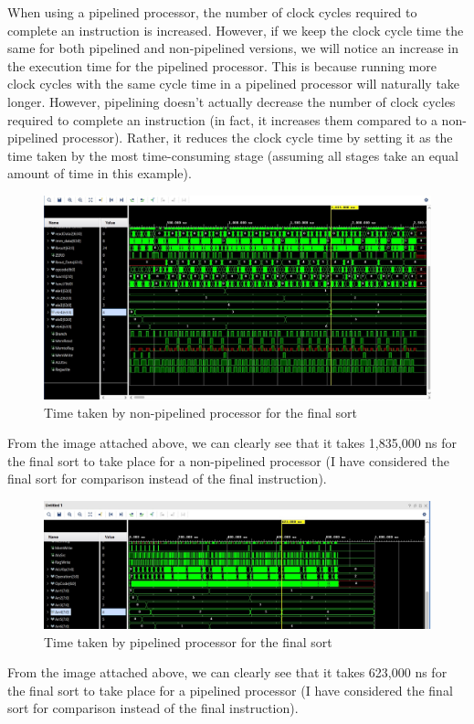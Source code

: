 \documentclass{article}
\begin{document}
When using a pipelined processor, the number of clock cycles required to complete an instruction is increased. However, if we keep the clock cycle time the same for both pipelined and non-pipelined versions, we will notice an increase in the execution time for the pipelined processor. This is because running more clock cycles with the same cycle time in a pipelined processor will naturally take longer. However, pipelining doesn't actually decrease the number of clock cycles required to complete an instruction (in fact, it increases them compared to a non-pipelined processor). Rather, it reduces the clock cycle time by setting it as the time taken by the most time-consuming stage (assuming all stages take an equal amount of time in this example).

\begin{figure}[!h]
    \centering
    \includegraphics*[width = 9 cm]{comparison1.jpeg}
    \caption{Time taken by non-pipelined processor for the final sort}
    \label{fig:label10}
\end{figure}

From the image attached above, we can clearly see that it takes 1,835,000 ns for the final sort to take place for a non-pipelined processor (I have considered the final sort for comparison instead of the final instruction).

\begin{figure}[!h]
    \centering
    \includegraphics*[width = 9 cm]{comparison2.jpeg}
    \caption{Time taken by pipelined processor for the final sort}
    \label{fig:label11}
\end{figure}

From the image attached above, we can clearly see that it takes 623,000 ns for the final sort to take place for a pipelined processor (I have considered the final sort for comparison instead of the final instruction).
\end{document}
